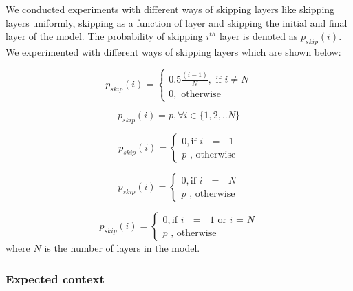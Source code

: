\documentclass[11pt]{article}
\begin{document}
We conducted experiments with different ways of skipping layers like skipping layers uniformly, skipping as a function of layer and skipping the initial and final layer of the model. The probability of skipping $i^{th}$ layer is denoted as $p_{skip}(i)$. We experimented with different ways of skipping layers which are shown below:



\begin{equation}
\label{eqn:functionalskip}
    p_{skip}(i)= 
    \begin{cases}
        0.5 \frac{(i-1)}{N} , \text{ if  } i \neq N \\
        0 , \text{  otherwise}
    \end{cases}
\end{equation}

\begin{equation}
\label{eqn:uniformskip}
  p_{skip}(i)= p , \forall i \in \{1,2,.. N\}
\end{equation}

\begin{equation}
\label{eqn:uniformskip_initial}
    p_{skip}(i)= 
    \begin{cases}
        0,  \text{if  $i$ $=$ $1$}  \\
        p  \text{ ,  otherwise}
    \end{cases}
\end{equation}

\begin{equation}
\label{eqn:uniformskip_final}
    p_{skip}(i)= 
    \begin{cases}
        0,  \text{if  $i$ $=$ $N$}  \\
        p  \text{ ,  otherwise}
    \end{cases}
\end{equation}

\begin{equation}
\label{eqn:uniformskip_both}
    p_{skip}(i)= 
    \begin{cases}
        0,  \text{if  $i$ $=$ $1$ or $i$ = $N$}  \\
        p  \text{ ,  otherwise}
    \end{cases}
\end{equation}
where $N$ is the number of layers in the model. 



\subsubsection{Expected context}
\label{subsec:expected_context}
\end{document}
